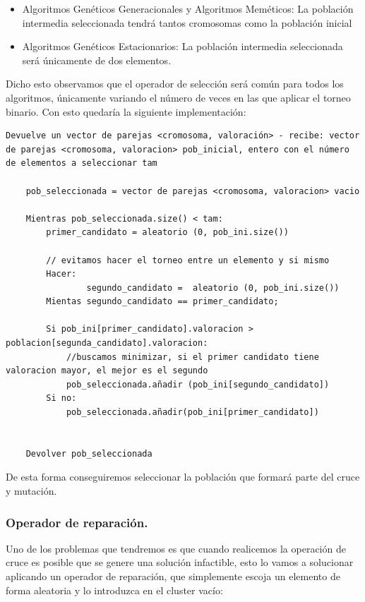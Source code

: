 \documentclass[12pt, spanish]{article}
\begin{document}
\begin{itemize}
	\item Algoritmos Genéticos Generacionales y Algoritmos Meméticos: La población intermedia seleccionada tendrá tantos cromosomas como la población inicial
	\item Algoritmos Genéticos Estacionarios: La población intermedia seleccionada será únicamente de dos elementos.
\end{itemize}

Dicho esto observamos que el operador de selección será común para todos los algoritmos, únicamente variando el número de veces en las que aplicar el torneo binario. Con esto quedaría la siguiente implementación:

\begin{lstlisting}
Devuelve un vector de parejas <cromosoma, valoración> - recibe: vector de parejas <cromosoma, valoracion> pob_inicial, entero con el número de elementos a seleccionar tam

	pob_seleccionada = vector de parejas <cromosoma, valoracion> vacio
	
	Mientras pob_seleccionada.size() < tam:
		primer_candidato = aleatorio (0, pob_ini.size())
		
		// evitamos hacer el torneo entre un elemento y si mismo
		Hacer:
				segundo_candidato =  aleatorio (0, pob_ini.size())
		Mientas segundo_candidato == primer_candidato;
		
		Si pob_ini[primer_candidato].valoracion > poblacion[segunda_candidato].valoracion:
			//buscamos minimizar, si el primer candidato tiene valoracion mayor, el mejor es el segundo
			pob_seleccionada.añadir (pob_ini[segundo_candidato])
		Si no:
			pob_seleccionada.añadir(pob_ini[primer_candidato])


	Devolver pob_seleccionada
\end{lstlisting}

De esta forma conseguiremos seleccionar la población que formará parte del cruce y mutación.


\subsubsection{Operador de reparación.}

Uno de los problemas que tendremos es que cuando realicemos la operación de cruce es posible que se genere una solución infactible, esto lo vamos a solucionar aplicando un operador de reparación, que simplemente escoja un elemento de forma aleatoria y lo introduzca en el cluster vacío:
\end{document}

